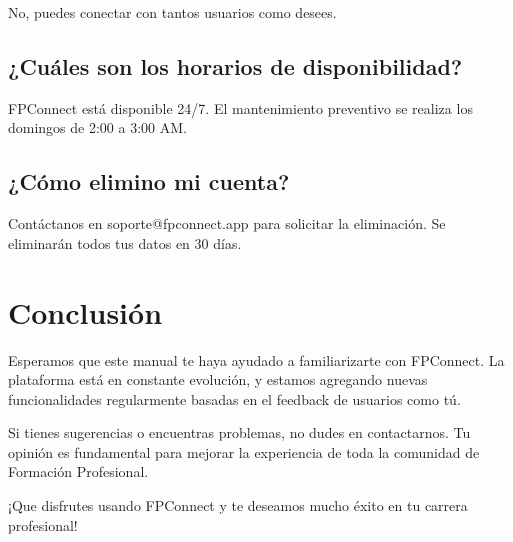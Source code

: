 \documentclass[a4paper]{report}
\begin{document}
No, puedes conectar con tantos usuarios como desees.

\section{¿Cuáles son los horarios de disponibilidad?}

FPConnect está disponible 24/7. El mantenimiento preventivo se realiza los domingos de 2:00 a 3:00 AM.

\section{¿Cómo elimino mi cuenta?}

Contáctanos en soporte@fpconnect.app para solicitar la eliminación. Se eliminarán todos tus datos en 30 días.

\newpage

\chapter*{Conclusión}

Esperamos que este manual te haya ayudado a familiarizarte con FPConnect. La plataforma está en constante evolución, y estamos agregando nuevas funcionalidades regularmente basadas en el feedback de usuarios como tú.

Si tienes sugerencias o encuentras problemas, no dudes en contactarnos. Tu opinión es fundamental para mejorar la experiencia de toda la comunidad de Formación Profesional.

¡Que disfrutes usando FPConnect y te deseamos mucho éxito en tu carrera profesional!
\end{document}
